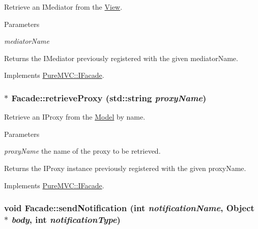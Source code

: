 Retrieve an {\ttfamily IMediator} from the {\ttfamily \hyperlink{class_pure_m_v_c_1_1_view}{View}}. 
\begin{DoxyParams}{Parameters}
\item[{\em mediatorName}]\end{DoxyParams}
\begin{DoxyReturn}{Returns}
the {\ttfamily IMediator} previously registered with the given {\ttfamily mediatorName}. 
\end{DoxyReturn}


Implements \hyperlink{class_pure_m_v_c_1_1_i_facade_aa253e28220cf0f077ac212d0acf7652d}{PureMVC::IFacade}.\hypertarget{class_pure_m_v_c_1_1_facade_a6cba094fce77dac303714372a8bb3fc5}{
\subsubsection[{retrieveProxy}]{ $\ast$ Facade::retrieveProxy (std::string {\em proxyName})}}
\label{class_pure_m_v_c_1_1_facade_a6cba094fce77dac303714372a8bb3fc5}


Retrieve an {\ttfamily IProxy} from the {\ttfamily \hyperlink{class_pure_m_v_c_1_1_model}{Model}} by name. 
\begin{DoxyParams}{Parameters}
\item[{\em proxyName}]the name of the proxy to be retrieved. \end{DoxyParams}
\begin{DoxyReturn}{Returns}
the {\ttfamily IProxy} instance previously registered with the given {\ttfamily proxyName}. 
\end{DoxyReturn}


Implements \hyperlink{class_pure_m_v_c_1_1_i_facade_a0af423a85df80b52acd106c5adf07318}{PureMVC::IFacade}.\hypertarget{class_pure_m_v_c_1_1_facade_a39a61e0a65d0f979848d36fe99cfd5f5}{
\subsubsection[{sendNotification}]{\setlength{\rightskip}{0pt plus 5cm}void Facade::sendNotification (int {\em notificationName}, \/  {\bf Object} $\ast$ {\em body}, \/  int {\em notificationType})}}
\label{class_pure_m_v_c_1_1_facade_a39a61e0a65d0f979848d36fe99cfd5f5}


